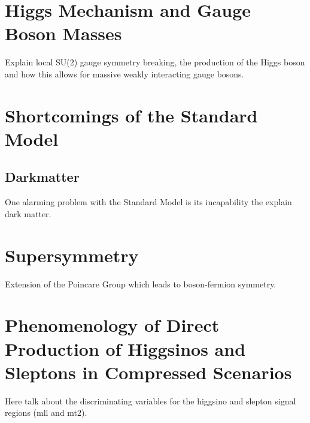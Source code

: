 \section{Higgs Mechanism and Gauge Boson Masses}
\label{sec:theory4}
Explain local SU(2) gauge symmetry breaking, the production of the Higgs boson and how this allows for massive weakly interacting gauge bosons.

\section{Shortcomings of the Standard Model}
\label{sec:theory5}
\subsection{Darkmatter}
One alarming problem with the Standard Model is its incapability the explain dark matter.

\section{Supersymmetry}
\label{sec:theory6}
Extension of the Poincare Group which leads to boson-fermion symmetry.

\section{Phenomenology of Direct Production of Higgsinos and Sleptons in Compressed Scenarios}
Here talk about the discriminating variables for the higgsino and slepton signal regions (mll and mt2).